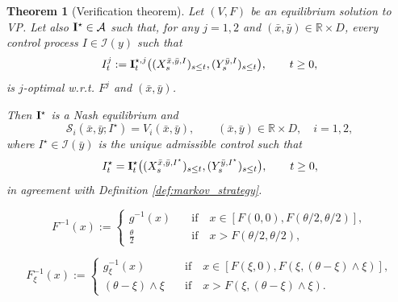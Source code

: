 \documentclass[10pt,a4paper]{amsart}
\newtheorem{theorem}{Theorem}
\def \R {\mathbb{R}}
\def\cS{{\mathcal S}}
\newcommand\contr{{\bf I}}
\begin{document}
\begin{theorem}[Verification theorem]\label{th:verific_th}
Let $(V,F)$ be an equilibrium solution to VP. Let also $\contr^{\star}\in\mathcal{A}$ such that, for any $j=1,2$ %
 and $(\bar{x},\bar{y})\in \R\times {D}$, every control process $I\in\mathcal{I}(y)$ such that 
\begin{equation}\label{eq:cond_Iit}
I^j_t := \contr_t^{\star,j}\big((X^{\bar x,\bar y,I}_s)_{s\leq t}, (Y^{\bar y,I}_{s} )_{s\leq t}\big), \qquad t\geq 0, 
\end{equation}
is $j$-optimal w.r.t. ${F^j}$ and $(\bar{x},\bar{y})$.

Then $\contr^{\star}$ is a Nash equilibrium and 
\begin{equation}\label{eq:nash_cond_th}
\cS_i(\bar x,\bar y; I^{\star}) = V_i(\bar x,\bar y) , \qquad (\bar x,\bar y)\in \R\times D,\quad  i = 1,2,
\end{equation}
where $I^{\star}\in\mathcal{I}(\bar y)$ is the unique admissible control such that 
\begin{equation}\label{eq:I_markov_star}
I^{\star}_t = \contr_t^{\star}\big((X^{\bar x,\bar y,I^{\star}}_s)_{s\leq t}, (Y^{\bar y,I^{\star}}_{s})_{s\leq t}\big), \qquad t\geq 0, 
\end{equation}
in agreement with Definition \ref{def:markov_strategy}.
\end{theorem}

\begin{equation}\label{eq:invF_dyn}
{F}^{-1}(x):= \begin{cases}
g^{-1}(x) &\quad \text{if}\quad x\in [{F}(0,0),{F}(\theta/2,\theta/2)],\\ %
\frac{\theta}{2} & \quad \text{if}\quad x> F(\theta/2,\theta/2 ),%
\end{cases}
\end{equation}

\begin{equation}\label{eq:invFi_dyn}
{F}_{\xi}^{-1}(x):= \begin{cases}
g_{\xi}^{-1}(x) &\quad \text{if}\quad x\in [{{F}(\xi,0),{F}({\xi,(\theta-\xi)\wedge \xi})}],\\ 
(\theta-\xi) \wedge \xi  & \quad \text{if}\quad x> {{F}({\xi,(\theta-\xi)\wedge \xi})}.
\end{cases}
\end{equation}
\end{document}
